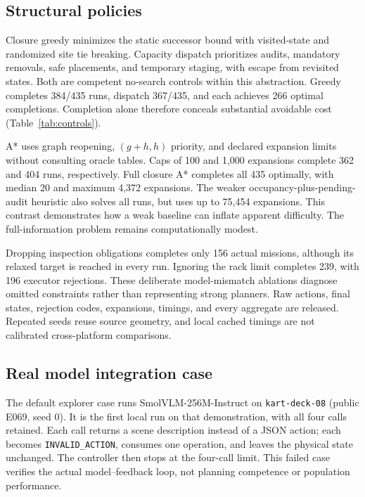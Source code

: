 \documentclass[10pt,twocolumn,letterpaper]{article}
\begin{document}
\begin{table}[t]
\centering\small
\caption{Structural controls on 145 episodes. The oracle uses one seed;
all other policies use three tie-order seeds (435 runs). Regret is mean
excess among successful runs. Relations are privileged, so these are not
image-track VLM results.}

\label{tab:controls}
\end{table}

\subsection{Structural policies}
Closure greedy minimizes the static successor bound with visited-state
and randomized site tie breaking. Capacity dispatch prioritizes audits,
mandatory removals, safe placements, and temporary staging, with escape
from revisited states. Both are competent no-search controls within this
abstraction. Greedy completes 384/435 runs, dispatch 367/435, and each
achieves 266 optimal completions. Completion alone therefore conceals
substantial avoidable cost (Table~\ref{tab:controls}).

A* uses graph reopening, $(g+h,h)$ priority, and declared expansion
limits without consulting oracle tables. Caps of 100 and 1,000 expansions
complete 362 and 404 runs, respectively. Full closure A* completes all 435
optimally, with median 20 and maximum 4,372 expansions. The weaker
occupancy-plus-pending-audit heuristic also solves all runs, but uses
up to 75,454 expansions. This contrast demonstrates how a weak baseline
can inflate apparent difficulty. The full-information problem remains
computationally modest.

Dropping inspection obligations completes only 156 actual missions,
although its relaxed target is reached in every run. Ignoring the rack
limit completes 239, with 196 executor rejections. These deliberate
model-mismatch ablations diagnose omitted constraints rather than
representing strong planners. Raw actions, final states, rejection codes,
expansions, timings, and every aggregate are released. Repeated seeds
reuse source geometry, and local cached timings are not calibrated
cross-platform comparisons.

\subsection{Real model integration case}
The default explorer case runs SmolVLM-256M-Instruct on
\texttt{kart-deck-08} (public E069, seed 0). It is the first local run on
that demonstration, with all four calls retained. Each call returns a
scene description instead of a JSON action; each becomes
\texttt{INVALID\_ACTION}, consumes one operation, and leaves the physical
state unchanged. The controller then stops at the four-call limit.
This failed case verifies the actual model--feedback loop, not planning
competence or population performance.
\end{document}
